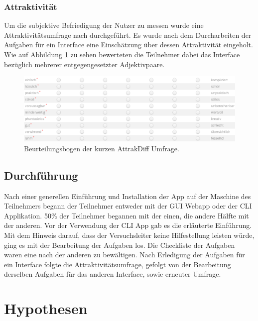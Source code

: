 \documentclass[oneside,bibliography=totocnumbered,BCOR=5mm]{scrbook}
\begin{document}
\subsubsection{Attraktivität}

Um die subjektive Befriedigung der Nutzer zu messen wurde eine
Attraktivitätsumfrage nach \textcite{attrakdiff} durchgeführt. Es wurde nach
dem Durcharbeiten der Aufgaben für ein Interface eine Einschätzung über
dessen Attraktivität eingeholt. Wie auf Abbildung \ref{fig:survey-values}
zu sehen bewerteten die Teilnehmer dabei das Interface bezüglich mehrerer
entgegengesetzter Adjektivpaare.

\begin{figure}[H]
  \centering
  \includegraphics[scale=0.42]{survey-values.png}
  \caption{Beurteilungsbogen der kurzen AttrakDiff Umfrage.}
  \label{fig:survey-values}
\end{figure}

\subsection{Durchführung}

Nach einer generellen Einführung und Installation der App auf der Maschine des
Teilnehmers begann der Teilnehmer entweder mit der GUI Webapp oder der CLI
Applikation. 50\% der Teilnehmer begannen mit der einen, die andere Hälfte mit
der anderen. Vor der Verwendung der CLI App gab es die erläuterte Einführung.
Mit dem Hinweis darauf, dass der Versuchsleiter keine Hilfestellung leisten
würde, ging es mit der Bearbeitung der Aufgaben los. Die Checkliste der Aufgaben
waren eine nach der anderen zu bewältigen. Nach Erledigung der Aufgaben für
ein Interface folgte die Attraktivitätsumfrage, gefolgt von der Bearbeitung
derselben Aufgaben für das anderen Interface, sowie erneuter Umfrage.

\section{Hypothesen}

\newcommand{\hypodef}[1]{
  \medskip
  \medskip
  \fbox{\parbox{\linewidth}{
    \refstepcounter{hypo}
    Hypothese~\thehypo: #1
    \label{hypo:\thehypo}
  }}
}
\newcommand{\hyporef}[2]{
  \medskip
  \fbox{\parbox{\linewidth}{
    \hyperref[hypo:#1]{Hypothese~#1}: #2
  }}
}
\end{document}
